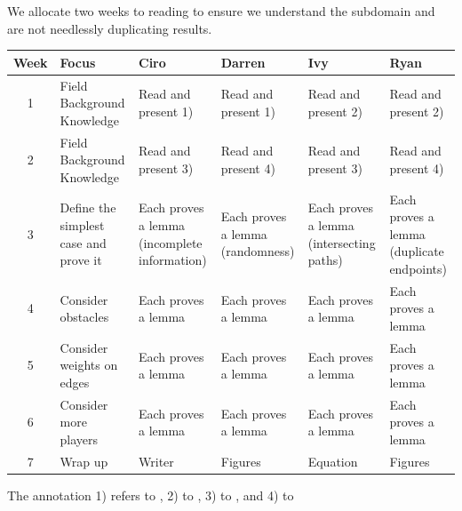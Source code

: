 We allocate two weeks to reading to ensure we understand the subdomain and are not needlessly duplicating results.

\begin{table}[h!]
    \centering
    \renewcommand{\arraystretch}{1.3}
    \begin{tabularx}{\textwidth}{|c|X|X|X|X|X|}
    \hline
    \textbf{Week} & \textbf{Focus} & \textbf{Ciro} & \textbf{Darren} & \textbf{Ivy} & \textbf{Ryan} \\
    \hline
    
    1 & Field Background Knowledge 
      & Read and present 1) 
      & Read and present 1) 
      & Read and present 2) 
      & Read and present 2) \\
    \hline
    
    2 & Field Background Knowledge
      & Read and present 3) 
      & Read and present 4) 
      & Read and present 3) 
      & Read and present 4) \\
    \hline
    
    3 & Define the simplest case and prove it 
      & Each proves a lemma (incomplete information)
      & Each proves a lemma (randomness)
      & Each proves a lemma (intersecting paths)
      & Each proves a lemma (duplicate endpoints) \\
    \hline
    
    4 & Consider obstacles
      & Each proves a lemma
      & Each proves a lemma
      & Each proves a lemma
      & Each proves a lemma \\
    \hline
    
    5 & Consider weights on edges
      & Each proves a lemma
      & Each proves a lemma
      & Each proves a lemma
      & Each proves a lemma \\
    \hline
    
    6 & Consider more players
      & Each proves a lemma
      & Each proves a lemma
      & Each proves a lemma
      & Each proves a lemma \\
    \hline
    
    7 & Wrap up
      & Writer
      & Figures
      & Equation
      & Figures \\
    \hline
    
    \end{tabularx}
    \end{table}

The annotation 1) refers to \parencite{One}, 2) to \parencite{Two}, 3) to \parencite{Three}, and 4) to \parencite{Four}
    